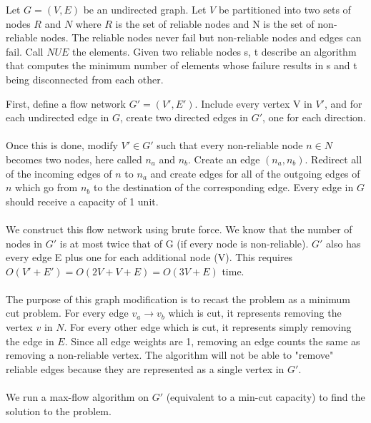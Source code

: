\documentclass[11pt]{article}
\begin{document}



Let $G = (V, E)$ be an undirected graph. Let $V$ be partitioned into two sets of nodes $R$ and $N$ where $R$ is the set of reliable nodes and N is the set of non-reliable nodes. The reliable nodes never fail but non-reliable nodes and edges can fail. Call $N U E$ the elements. Given two reliable nodes s, t describe an algorithm that computes the minimum number of elements
whose failure results in s and t being disconnected from each other.

\begin{solution}
First, define a flow network $G'=(V', E')$. Include every vertex V in $V'$, and for each undirected edge in $G$, create two directed edges in $G'$, one for each direction. \\ \\
Once this is done, modify $V' \in G'$ such that every non-reliable node $n \in N$ becomes two nodes, here called $n_a$ and $n_b$. Create an edge $(n_a,n_b)$. Redirect all of the incoming edges of $n$ to $n_a$ and create edges for all of the outgoing edges of $n$ which go from $n_b$ to the destination of the corresponding edge. Every edge in $G$ should receive a  capacity of 1 unit. \\ \\
We construct this flow network using brute force. We know that the number of nodes in $G'$ is at most twice that of G (if every node is non-reliable). $G'$ also has every edge E plus one for each additional node (V). This requires $O(V'+E')=O(2V+V+E)=O(3V+E)$ time.   \\ \\
The purpose of this graph modification is to recast the problem as a minimum cut problem. For every edge $v_a \to v_b$ which is cut, it represents removing the vertex $v$ in $N$. For every other edge which is cut, it represents simply removing the edge in $E$. Since all edge weights are 1, removing an edge counts the same as removing a non-reliable vertex. The algorithm will not be able to "remove" reliable edges because they are represented as a single vertex in $G'$. \\ \\
We run a max-flow algorithm on $G'$ (equivalent to a min-cut capacity) to find the solution to the problem. \\


\end{solution}
\end{document}

